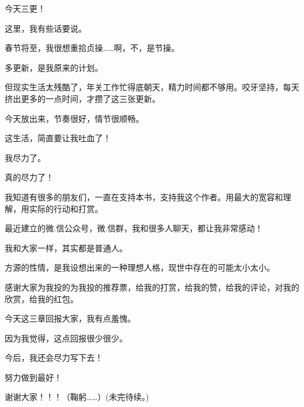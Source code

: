 \begin{this_body}
今天三更！

这里，我有些话要说。

春节将至，我很想重拾贞操……啊，不，是节操。

多更新，是我原来的计划。

但现实生活太残酷了，年关工作忙得底朝天，精力时间都不够用。咬牙坚持，每天挤出更多的一点时间，才攒了这三张更新。

今天放出来，节奏很好，情节很顺畅。

这生活，简直要让我吐血了！

我尽力了。

真的尽力了！

我知道有很多的朋友们，一直在支持本书，支持我这个作者。用最大的宽容和理解，用实际的行动和打赏。

最近建立的微.信公众号，微.信群，我和很多人聊天，都让我非常感动！

我和大家一样，其实都是普通人。

方源的性情，是我设想出来的一种理想人格，现世中存在的可能太小太小。

感谢大家为我投的为我投的推荐票，给我的打赏，给我的赞，给我的评论，对我的欣赏，给我的红包。

今天这三章回报大家，我有点羞愧。

因为我觉得，这点回报很少很少。

今后，我还会尽力写下去！

努力做到最好！

谢谢大家！！！（鞠躬……）(未完待续。)

\end{this_body}

